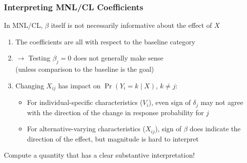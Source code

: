 \documentclass{beamer}
\begin{document}
\begin{frame}
\frametitle{Interpreting MNL/CL Coefficients}
In MNL/CL, $\beta$ itself is not necessarily informative about the effect
  of $X$
\bigskip
\pause
\begin{enumerate}
\item The coefficients are all with respect to the baseline
  category
\item[] $\longrightarrow$ Testing $\beta_j = 0$ does not generally make
  sense \\
(unless comparison to the baseline is the goal)

\pause
\medskip

\item Changing $X_{ij}$ has impact on $\Pr(Y_i=k\mid X)$, $k \neq j$:
\pause
\smallskip
	\begin{itemize}
	\addtolength{\itemsep}{.25\baselineskip}
	\item For individual-specific characteristics ($V_i$), even sign of $\delta_j$ may not agree with the direction of the change in response probability for $j$

	\pause

	\item For alternative-varying characteristics ($X_{ij}$), sign of $\beta$ does indicate the direction of the effect, but magnitude is hard to interpret

	\end{itemize}
\end{enumerate}

\pause
\bigskip
Compute a quantity that has a clear substantive interpretation!

\end{frame}
\end{document}
